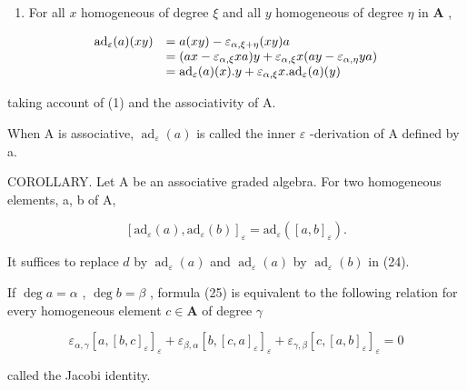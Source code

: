 \begin{enumerate}
\def\labelenumi{(\roman{enumi})}
\setcounter{enumi}{1}
\tightlist
\item
  For all \(x\) homogeneous of degree \(\xi\) and all \(y\) homogeneous of degree \(\eta\) in \(\mathbf{A}\) ,
\end{enumerate}

\[
\begin{array}{r l} \mathrm{ad} _ {\varepsilon} (a) (x y) & = a (x y) - \varepsilon_ {\alpha , \xi + \eta} (x y) a \\ & = (a x - \varepsilon_ {\alpha , \xi} x a) y + \varepsilon_ {\alpha , \xi} x (a y - \varepsilon_ {\alpha , \eta} y a) \\ & = \mathrm{ad} _ {\varepsilon} (a) (x). y + \varepsilon_ {\alpha , \xi} x. \mathrm{ad} _ {\varepsilon} (a) (y) \end{array}
\]

taking account of (1) and the associativity of A.

When A is associative, \(\operatorname{ad}_{\varepsilon}(a)\) is called the inner \(\varepsilon\) -derivation of A defined by a.

COROLLARY. Let A be an associative graded algebra. For two homogeneous elements, a, b of A,

\[
[ \mathrm{ad} _ {\varepsilon} (a), \mathrm{ad} _ {\varepsilon} (b) ] _ {\varepsilon} = \mathrm{ad} _ {\varepsilon} ([ a, b ] _ {\varepsilon}).\tag{25}
\]

It suffices to replace \(d\) by \(\operatorname{ad}_{\varepsilon}(a)\) and \(\operatorname{ad}_{\varepsilon}(a)\) by \(\operatorname{ad}_{\varepsilon}(b)\) in (24).

If \(\deg a = \alpha\) , \(\deg b = \beta\) , formula (25) is equivalent to the following relation for every homogeneous element \(c \in \mathbf{A}\) of degree \(\gamma\)

\[
\varepsilon_ {\alpha , \gamma} [ a, [ b, c ] _ {\varepsilon} ] _ {\varepsilon} + \varepsilon_ {\beta , \alpha} [ b, [ c, a ] _ {\varepsilon} ] _ {\varepsilon} + \varepsilon_ {\gamma , \beta} [ c, [ a, b ] _ {\varepsilon} ] _ {\varepsilon} = 0\tag{26}
\]

called the Jacobi identity.

